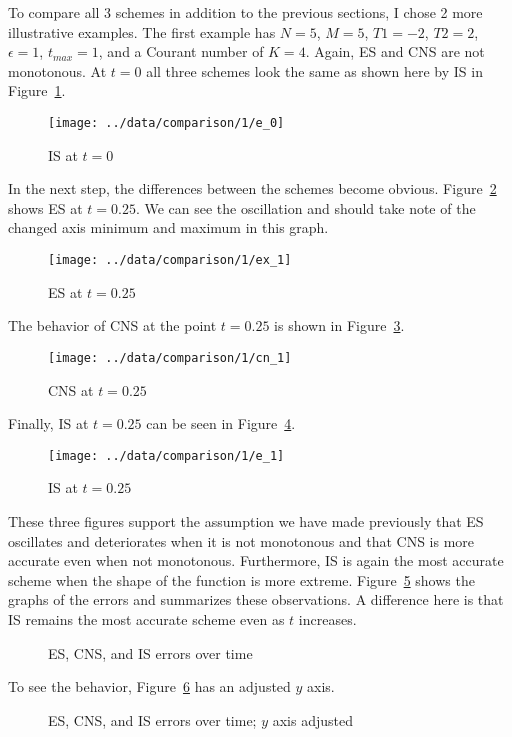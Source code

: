\documentclass[a4paper, 12pt, reqno]{article}
\newcommand{\figref}[1]{Figure~\ref{#1}}
\begin{document}
To compare all 3 schemes in addition to the previous sections, I chose 2 more
illustrative examples. The first example has $N=5$, $M=5$, $T1=-2$, $T2=2$,
$\epsilon =1$, $t_{max}=1$, and a Courant number of $K=4$. Again, ES and CNS
are not monotonous. At $t=0$ all three
schemes look the same as shown here by IS in \figref{cs01}.
\begin{figure}[H]
    \center
    \texttt{[image: ../data/comparison/1/e\_0]}
    \vspace{-20pt}
    \caption{IS at $t=0$}
    \label{cs01}
\end{figure}
In the next step, the differences between the schemes become obvious.
\figref{cs02} shows ES at $t=0.25$. We can see the oscillation and should take
note of the changed axis minimum and maximum in this graph.
\begin{figure}[H]
    \center
    \texttt{[image: ../data/comparison/1/ex\_1]}
    \vspace{-20pt}
    \caption{ES at $t=0.25$}
    \label{cs02}
\end{figure}
The behavior of CNS at the point $t=0.25$ is shown in \figref{cs03}.
\begin{figure}[H]
    \center
    \texttt{[image: ../data/comparison/1/cn\_1]}
    \vspace{-20pt}
    \caption{CNS at $t=0.25$}
    \label{cs03}
\end{figure}
Finally, IS at $t=0.25$ can be seen in \figref{cs04}.
\begin{figure}[H]
    \center
    \texttt{[image: ../data/comparison/1/e\_1]}
    \vspace{-20pt}
    \caption{IS at $t=0.25$}
    \label{cs04}
\end{figure}
These three figures support the assumption we have made previously that ES
oscillates and deteriorates when it is not monotonous and that CNS is more accurate 
even when not monotonous. Furthermore, IS is again the most accurate scheme 
when the shape of
the function is more extreme. \figref{cs05} shows the graphs of the errors and
summarizes these observations. A difference here is that IS remains the most
accurate scheme even as $t$ increases.
\begin{figure}[H]
    \center
    \vspace{-20pt}
    \caption{ES, CNS, and IS errors over time}
    \label{cs05}
\end{figure}
To see the behavior, \figref{cs06} has an adjusted $y$ axis.
\begin{figure}[H]
    \center
    \vspace{-20pt}
    \caption{ES, CNS, and IS errors over time; $y$ axis adjusted}
    \label{cs06}
\end{figure}
\end{document}
